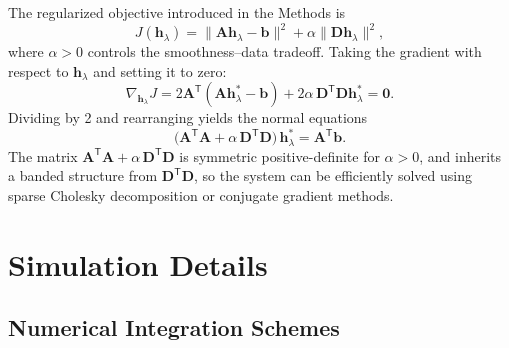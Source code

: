 The regularized objective introduced in the Methods is
\begin{equation}
J(\boldsymbol{h}_\lambda)
= \|\mathbf{A}\boldsymbol{h}_\lambda - \boldsymbol{b}\|^2
+ \alpha \|\mathbf{D}\boldsymbol{h}_\lambda\|^2,
\end{equation}
where $\alpha > 0$ controls the smoothness--data tradeoff.
Taking the gradient with respect to $\boldsymbol{h}_\lambda$ and setting it to zero:
\begin{equation}
\nabla_{\boldsymbol{h}_\lambda} J
= 2\mathbf{A}^\mathsf{T}(\mathbf{A}\boldsymbol{h}_\lambda^* - \boldsymbol{b})
+ 2\alpha\,\mathbf{D}^\mathsf{T}\mathbf{D}\boldsymbol{h}_\lambda^*
= \mathbf{0}.
\end{equation}
Dividing by 2 and rearranging yields the normal equations
\begin{equation}
\bigl(\mathbf{A}^\mathsf{T}\mathbf{A}
+ \alpha\,\mathbf{D}^\mathsf{T}\mathbf{D}\bigr)\,\boldsymbol{h}_\lambda^*
= \mathbf{A}^\mathsf{T}\boldsymbol{b}.
\end{equation}
The matrix $\mathbf{A}^\mathsf{T}\mathbf{A} + \alpha\,\mathbf{D}^\mathsf{T}\mathbf{D}$ is symmetric positive-definite for $\alpha > 0$, and inherits a banded structure from $\mathbf{D}^\mathsf{T}\mathbf{D}$, so the system can be efficiently solved using sparse Cholesky decomposition or conjugate gradient methods.

\section{Simulation Details} \label{app:simulationdetails}

\subsection{Numerical Integration Schemes}

